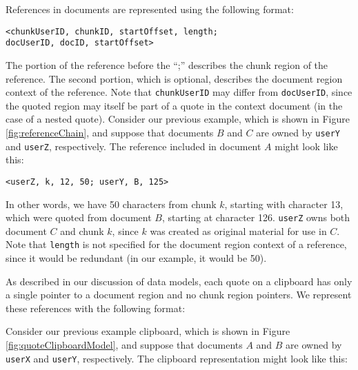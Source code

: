 \documentclass{acm_proc_article-sp}
\begin{document}
References in documents are represented using the following format:
\begin{center}
{\tt <chunkUserID, chunkID, startOffset, length;\\ 
docUserID, docID, startOffset>} 
\end{center}
The portion of the reference before the ``;'' describes the chunk region of the reference.  
The second portion, which is optional, describes the document region context of the reference.  
Note that {\tt chunkUserID} may differ from {\tt docUserID}, since the quoted region may itself be part of a quote in the context document (in the case of a nested quote).
Consider our previous example, which is shown in Figure \ref{fig:referenceChain}, and suppose that documents $B$ and  $C$ are owned by {\tt userY} and {\tt userZ}, respectively.
The reference included in document $A$ might look like this:
\begin{center}
{\tt <userZ, k, 12, 50; userY, B, 125>} 
\end{center}
In other words, we have 50 characters from chunk $k$, starting with character 13, which were quoted from document $B$, starting at character 126.
{\tt userZ} owns both document $C$ and chunk $k$, since $k$ was created as original material for use in $C$.
Note that {\tt length} is not specified for the document region context of a reference, since it would be redundant (in our example, it would be 50).


As described in our discussion of data models, each quote on a clipboard has only a single pointer to a document region and no chunk region pointers.
We represent these references with the following format:
\begin{center}
{\tt <docUserID, docID, startOffset, length>} 
\end{center}
Consider our previous example clipboard, which is shown in Figure \ref{fig:quoteClipboardModel}, and suppose that documents $A$ and  $B$ are owned by {\tt userX} and {\tt userY}, respectively.
The clipboard representation might look like this:
\begin{center}
{\tt <userX, A, 37, 75>}\\
{\tt <userY, B, 100, 50>}\\ 
\end{center}
\end{document}
